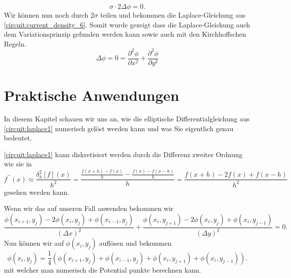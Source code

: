 \begin{enumerate}
	\begin{equation}
	\sigma \cdot 2\Delta\phi=0.
	\end{equation}
Wir können nun noch durch $2\sigma$ teilen und bekommen die Laplace-Gleichung aus \eqref{circuit:current_density_6}. Somit wurde gezeigt dass die Laplace-Gleichung auch dem Variationsprinzip gefunden werden kann sowie auch mit den Kirchhoffschen Regeln.
	\begin{equation}
	\Delta\phi=0=\frac{\partial^2\phi}{\partial x^2}+\frac{\partial^2\phi}{\partial y^2}
	\label{circuit:laplace1}
	\end{equation}
\end{enumerate}

\section{Praktische Anwendungen}
In diesem Kapitel schauen wir uns an, wie die elliptische Differentialgleichung aus \eqref{circuit:laplace1} numerisch gelöst werden kann und was Sie eigentlich genau bedeutet.

\eqref{circuit:laplace1} kann diskretisiert werden durch die Differenz zweiter Ordnung wie sie in 
\begin{equation}
	f^{\prime \prime}(x) \approx \frac{\delta_h^2[f](x)}{h^2}=\frac{\frac{f(x+h)-f(x)}{h}-\frac{f(x)-f(x-h)}{h}}{h}=\frac{f(x+h)-2 f(x)+f(x-h)}{h^2}
	\label{circuit:second-order-central}
\end{equation}
\cite{enwiki:1220817436} gesehen werden kann.

Wenn wir das auf unseren Fall anwenden bekommen wir
\begin{equation}
	\frac{\phi(x_{i+1}, y_j) - 2\phi(x_i, y_j) + \phi(x_{i-1}, y_j)}{(\Delta x)^2} + \frac{\phi(x_i, y_{j+1}) - 2\phi(x_i, y_j) + \phi(x_i, y_{j-1})}{(\Delta y)^2} = 0.
	\label{circuit:discret_equation}
\end{equation}
Nun können wir auf $\phi(x_i, y_j)$ auflösen und bekommen 
\begin{equation}
	\phi(x_i, y_j) = \frac{1}{4}(\phi(x_{i+1}, y_{j}) + \phi(x_{i-1}, y_{j}) + \phi(x_{i}, y_{j+1}) + \phi(x_{i}, y_{j-1})).
	\label{circuit:discret_equation2}
\end{equation}
mit welcher man numerisch die Potential punkte berechnen kann.
